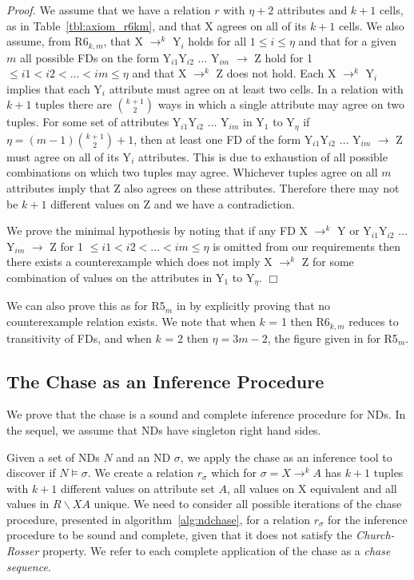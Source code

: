 {\em Proof.} We assume that we have a relation $r$ with $\eta + 2$
attributes and $k+1$ cells, as in Table~\ref{tbl:axiom_r6km}, and that
X agrees on all of its $k+1$ cells.  We also assume, from 
R6$_{k,m}$, that X $\to^k$ Y$_i$ holds for all $1 \le i \le \eta$ and
that for a given $m$ all possible FDs on the form Y$_{i1}$Y$_{i2}$ $\ldots$
Y$_{im}$ $\to$ Z hold for 1 $\le i1 < i2 < \ldots < im \le \eta$ and
that X $\to^k$ Z does not hold.
Each X $\to^k$ Y$_i$ implies that each Y$_i$ attribute must agree on
at least two cells. In a relation with $k + 1$ tuples there are 
${k+1 \choose 2}$ ways in which a single
attribute may agree on two tuples. For some set of attributes
Y$_{i1}$Y$_{i2}$ $\ldots$ Y$_{im}$ 
in Y$_1$ to Y$_{\eta}$ if $\eta = (m-1){k+1 \choose 2} + 1$, then at
least one FD of the form Y$_{i1}$Y$_{i2}$ $\ldots$
Y$_{im}$ $\to$ Z must agree on all of its Y$_i$ attributes. This is due to
exhaustion of all possible combinations on which two tuples may agree.
Whichever tuples agree on all $m$ attributes imply that Z also agrees
on these attributes. Therefore there may not be $k+1$
different values on Z and we have a contradiction. 
\medskip

We prove the minimal hypothesis by noting that if any FD X $\to^k$ Y
or Y$_{i1}$Y$_{i2}$ $\ldots$
Y$_{im}$ $\to$ Z for 1 $\le i1 < i2 < \ldots < im \le \eta$ is
omitted from our requirements then there exists a counterexample which
does not imply X $\to^k$ Z for some combination of values on the
attributes in Y$_1$ to Y$_{\eta}$. $\Box$

\smallskip

We can also prove this as for R5$_m$ in \cite{gm85b} by explicitly
proving that no counterexample relation exists.
We note that when $k$ = 1 then R6$_{k,m}$ reduces to transitivity of FDs,
and when $k$ = 2 then $\eta = 3m - 2$, the figure given in
\cite{gm85b} for R5$_m$. 


\subsection{The Chase as an Inference Procedure}\label{subsec:nd_ch_inf}

We prove that the chase is a 
sound and complete inference procedure for NDs. In the sequel, we
assume that NDs have singleton right hand sides.

Given a set of NDs $N$ and an ND $\sigma$, we apply the chase as an
inference tool to discover if $N \models \sigma$. 
We create a relation $r_\sigma$ which for $\sigma = X \to^k
A$ has $k+1$ tuples with $k+1$ different values on attribute set $A$,
all values on X equivalent and all values in $R \backslash XA$ unique.
We need to consider all possible iterations of the chase procedure,
presented in algorithm~\ref{alg:ndchase}, for a relation $r_\sigma$
for the inference procedure to be sound and complete, given that it
does not satisfy the {\em Church-Rosser} property. We refer to
each complete application of the chase as a {\em chase sequence}.

